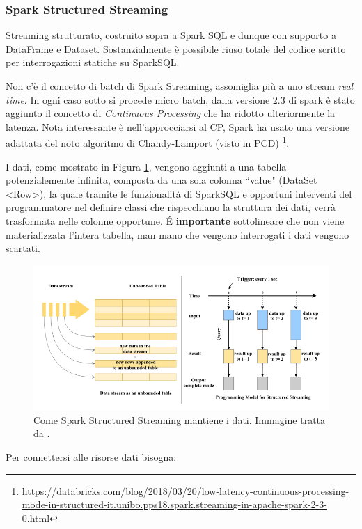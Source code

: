 \documentclass[12pt,italian]{article}
\renewcommand{\texttt}[1]{%
	\begingroup
	\ttfamily
	\begingroup\lccode`~=`/\lowercase{\endgroup\def~}{/\discretionary{}{}{}}%
	\begingroup\lccode`~=`[\lowercase{\endgroup\def~}{[\discretionary{}{}{}}%
	\begingroup\lccode`~=`.\lowercase{\endgroup\def~}{.\discretionary{}{}{}}%
	\catcode`/=\active\catcode`[=\active\catcode`.=\active
	\scantokens{#1\noexpand}%
	\endgroup
}
\begin{document}
\subsubsection{Spark Structured Streaming}\label{sec:structuredstreaming}
Streaming strutturato, costruito sopra a Spark SQL e dunque con supporto a DataFrame e Dataset. 
Sostanzialmente è possibile riuso totale del codice scritto per interrogazioni statiche su SparkSQL.
\par Non c'è il concetto di batch di Spark Streaming, assomiglia più a uno stream \textit{real time}.
In ogni caso sotto si procede micro batch, dalla versione 2.3 di spark è stato aggiunto il concetto di \textit{Continuous Processing} che ha ridotto ulteriormente la latenza.
Nota interessante è nell'approcciarsi al CP, Spark ha usato una versione adattata del noto algoritmo di Chandy-Lamport (visto in PCD) \footnote{\url{https://databricks.com/blog/2018/03/20/low-latency-continuous-processing-mode-in-structured-it.unibo.pps18.spark.streaming-in-apache-spark-2-3-0.html}}.
\par I dati, come mostrato in Figura \ref{fig:StructuredStreaming}, vengono aggiunti a una tabella potenzialemente infinita, composta da una sola colonna ``value" (DataSet \textless Row\textgreater ),  la quale tramite le funzionalità di SparkSQL e opportuni interventi del programmatore nel definire classi che rispecchiano la struttura dei dati, verrà trasformata nelle colonne opportune.
É \textbf{importante} sottolineare che non viene materializzata l'intera tabella, man mano che vengono interrogati i dati vengono scartati. 
\begin{figure}[H]
	\centering 
	\includegraphics[width=1\linewidth]{img/sparkStructuredStreaming.png}
	\caption{Come Spark Structured Streaming mantiene i dati. Immagine tratta da \cite{structuredStreaming}.}
	\label{fig:StructuredStreaming}
\end{figure}
Per connettersi alle risorse dati bisogna:
\end{document}
